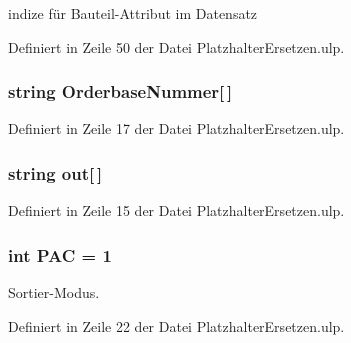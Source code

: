 indize für Bauteil-\/\+Attribut im Datensatz 



Definiert in Zeile 50 der Datei Platzhalter\+Ersetzen.\+ulp.

\hypertarget{_platzhalter_ersetzen_8ulp_a57ba39a1335c8ae9ef4eb8314d51160e}{}
\subsubsection[{Orderbase\+Nummer}]{\setlength{\rightskip}{0pt plus 5cm}string Orderbase\+Nummer\mbox{[}$\,$\mbox{]}}\label{_platzhalter_ersetzen_8ulp_a57ba39a1335c8ae9ef4eb8314d51160e}


Definiert in Zeile 17 der Datei Platzhalter\+Ersetzen.\+ulp.

\hypertarget{_platzhalter_ersetzen_8ulp_a2d524de6e72f33e2cffb9bed0a05cbc7}{}
\subsubsection[{out}]{\setlength{\rightskip}{0pt plus 5cm}string out\mbox{[}$\,$\mbox{]}}\label{_platzhalter_ersetzen_8ulp_a2d524de6e72f33e2cffb9bed0a05cbc7}


Definiert in Zeile 15 der Datei Platzhalter\+Ersetzen.\+ulp.

\hypertarget{_platzhalter_ersetzen_8ulp_af42346d5e4cb2b5ba2208adc44464398}{}
\subsubsection[{P\+A\+C}]{\setlength{\rightskip}{0pt plus 5cm}int P\+A\+C = 1}\label{_platzhalter_ersetzen_8ulp_af42346d5e4cb2b5ba2208adc44464398}


Sortier-\/\+Modus. 



Definiert in Zeile 22 der Datei Platzhalter\+Ersetzen.\+ulp.

\hypertarget{_platzhalter_ersetzen_8ulp_a9658b6387aed3b22f25a8be98530d385}{}
